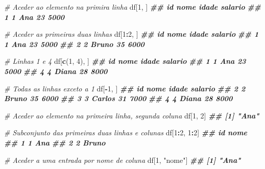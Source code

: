 \documentclass[
]{book}
\newenvironment{Shaded}{\begin{snugshade}}{\end{snugshade}}
\newcommand{\CommentTok}[1]{\textcolor[rgb]{0.56,0.35,0.01}{\textit{#1}}}
\newcommand{\DecValTok}[1]{\textcolor[rgb]{0.00,0.00,0.81}{#1}}
\newcommand{\DocumentationTok}[1]{\textcolor[rgb]{0.56,0.35,0.01}{\textbf{\textit{#1}}}}
\newcommand{\FunctionTok}[1]{\textcolor[rgb]{0.13,0.29,0.53}{\textbf{#1}}}
\newcommand{\NormalTok}[1]{#1}
\newcommand{\SpecialCharTok}[1]{\textcolor[rgb]{0.81,0.36,0.00}{\textbf{#1}}}
\newcommand{\StringTok}[1]{\textcolor[rgb]{0.31,0.60,0.02}{#1}}
\begin{document}
\begin{Shaded}
\begin{Highlighting}[]
\CommentTok{\# Aceder ao elemento na primira linha}
\NormalTok{df[}\DecValTok{1}\NormalTok{, ]}
\DocumentationTok{\#\#  id nome idade salario}
\DocumentationTok{\#\# 1  1  Ana    23    5000}

\CommentTok{\# Aceder as primeiras duas linhas}
\NormalTok{df[}\DecValTok{1}\SpecialCharTok{:}\DecValTok{2}\NormalTok{, ]}
\DocumentationTok{\#\#   id  nome idade salario}
\DocumentationTok{\#\# 1  1   Ana    23    5000}
\DocumentationTok{\#\# 2  2 Bruno    35    6000}

\CommentTok{\# Linhas 1 e 4}
\NormalTok{df[}\FunctionTok{c}\NormalTok{(}\DecValTok{1}\NormalTok{, }\DecValTok{4}\NormalTok{), ]}
\DocumentationTok{\#\#   id  nome idade salario}
\DocumentationTok{\#\# 1  1   Ana    23    5000}
\DocumentationTok{\#\# 4  4 Diana    28    8000}

\CommentTok{\# Todas as linhas exceto a 1}
\NormalTok{df[}\SpecialCharTok{{-}}\DecValTok{1}\NormalTok{, ]}
\DocumentationTok{\#\# id   nome idade salario}
\DocumentationTok{\#\# 2  2  Bruno    35    6000}
\DocumentationTok{\#\# 3  3 Carlos    31    7000}
\DocumentationTok{\#\# 4  4  Diana    28    8000}

\CommentTok{\# Aceder ao elemento na primeira linha, segunda coluna}
\NormalTok{df[}\DecValTok{1}\NormalTok{, }\DecValTok{2}\NormalTok{] }
\DocumentationTok{\#\# [1] "Ana"}

\CommentTok{\# Subconjunto das primeiras duas linhas e colunas}
\NormalTok{df[}\DecValTok{1}\SpecialCharTok{:}\DecValTok{2}\NormalTok{, }\DecValTok{1}\SpecialCharTok{:}\DecValTok{2}\NormalTok{]}
\DocumentationTok{\#\#   id  nome}
\DocumentationTok{\#\# 1  1   Ana}
\DocumentationTok{\#\# 2  2 Bruno}

\CommentTok{\# Aceder a uma entrada por nome de coluna}
\NormalTok{df[}\DecValTok{1}\NormalTok{, }\StringTok{"nome"}\NormalTok{] }
\DocumentationTok{\#\# [1] "Ana"}
\end{Highlighting}
\end{Shaded}
\end{document}
